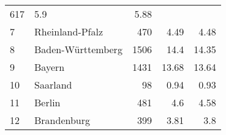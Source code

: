 \begin{longtable}{lXrrr}
       \num{617} &
       \num[round-mode=places,round-precision=2]{5.9} &
         \num[round-mode=places,round-precision=2]{5.88} \\

     7 &
     \multicolumn{1}{X}{ Rheinland-Pfalz   } &


       \num{470} &
       \num[round-mode=places,round-precision=2]{4.49} &
         \num[round-mode=places,round-precision=2]{4.48} \\

     8 &
     \multicolumn{1}{X}{ Baden-Württemberg   } &


       \num{1506} &
       \num[round-mode=places,round-precision=2]{14.4} &
         \num[round-mode=places,round-precision=2]{14.35} \\

     9 &
     \multicolumn{1}{X}{ Bayern   } &


       \num{1431} &
       \num[round-mode=places,round-precision=2]{13.68} &
         \num[round-mode=places,round-precision=2]{13.64} \\

     10 &
     \multicolumn{1}{X}{ Saarland   } &


       \num{98} &
       \num[round-mode=places,round-precision=2]{0.94} &
         \num[round-mode=places,round-precision=2]{0.93} \\

     11 &
     \multicolumn{1}{X}{ Berlin   } &


       \num{481} &
       \num[round-mode=places,round-precision=2]{4.6} &
         \num[round-mode=places,round-precision=2]{4.58} \\

     12 &
     \multicolumn{1}{X}{ Brandenburg   } &


       \num{399} &
       \num[round-mode=places,round-precision=2]{3.81} &
         \num[round-mode=places,round-precision=2]{3.8} \\


\end{longtable}
